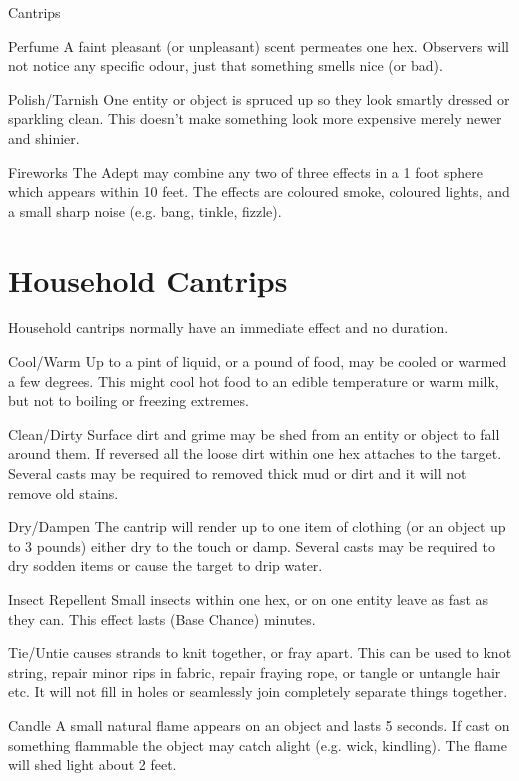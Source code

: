 \begin{Chapter}{Cantrips}
\begin{Description}
\item[Perfume] A faint pleasant (or unpleasant) scent permeates one
  hex.  Observers will not notice any specific odour, just that
  something smells nice (or bad).

\item[Polish/Tarnish] One entity or object is spruced up so they look
  smartly dressed or sparkling clean.  This doesn’t make something
  look more expensive merely newer and shinier.

\item[Fireworks] The Adept may combine any two of three effects in a 1
  foot sphere which appears within 10 feet.  The effects are coloured
  smoke, coloured lights, and a small sharp noise (e.g. bang, tinkle,
  fizzle).

\end{Description}


\section{Household Cantrips}

Household cantrips normally have an immediate effect and no duration.

\begin{Description}

\item[Cool/Warm Up] to a pint of liquid, or a pound of food, may be
  cooled or warmed a few degrees.  This might cool hot food to an
  edible temperature or warm milk, but not to boiling or freezing
  extremes.

\item[Clean/Dirty Surface] dirt and grime may be shed from an entity
  or object to fall around them.  If reversed all the loose dirt
  within one hex attaches to the target.  Several casts may be
  required to removed thick mud or dirt and it will not remove old
  stains.

\item[Dry/Dampen] The cantrip will render up to one item of clothing
  (or an object up to 3 pounds) either dry to the touch or damp.
  Several casts may be required to dry sodden items or cause the
  target to drip water.

\item[Insect Repellent] Small insects within one hex, or on one entity
  leave as fast as they can. This effect lasts (Base Chance) minutes.

\item[Tie/Untie] causes strands to knit together, or fray apart. This
  can be used to knot string, repair minor rips in fabric, repair
  fraying rope, or tangle or untangle hair etc.  It will not fill in
  holes or seamlessly join completely separate things together.

\item[Candle] A small natural flame appears on an object and lasts 5
  seconds.  If cast on something flammable the object may catch alight
  (e.g.  wick, kindling). The flame will shed light about 2 feet.

\end{Description}

\end{Chapter}

